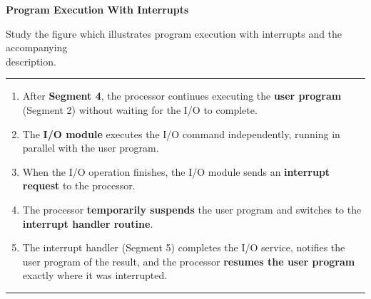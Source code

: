 \documentclass{article}
\begin{document}
\begin{examplebox}
    \textbf{Program Execution With Interrupts}

    Study the figure which illustrates program execution with interrupts and the accompanying \\ description.
    
    \noindent\rule{\textwidth}{0.4pt}
\begin{minipage}{0.65\textwidth}



\begin{enumerate}
    \item After \textbf{Segment 4}, the processor continues executing the \textbf{user program} (Segment 2) without waiting for the I/O to complete.
    \item The \textbf{I/O module} executes the I/O command independently, running in parallel with the user program.
    \item When the I/O operation finishes, the I/O module sends an \textbf{interrupt request} to the processor.
    \item The processor \textbf{temporarily suspends} the user program and switches to the \textbf{interrupt handler routine}.
    \item The interrupt handler (Segment 5) completes the I/O service, notifies the user program of the result, and the processor \textbf{resumes the user program} exactly where it was interrupted.
\end{enumerate}

\noindent\rule{\textwidth}{0.4pt}


\end{minipage}
\end{examplebox}
\end{document}
